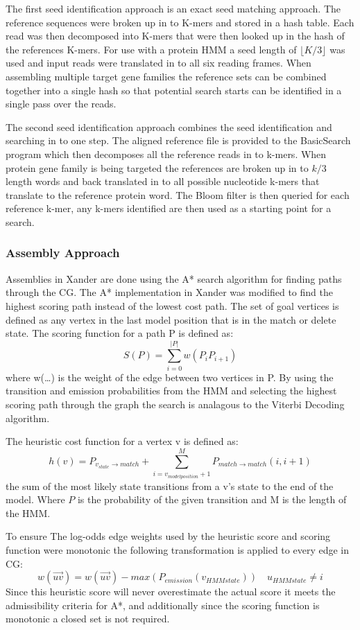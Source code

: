 \documentclass[10pt]{bmc_article}
\newenvironment{bmcformat}{\begin{raggedright}\baselineskip20pt\sloppy\setboolean{publ}{false}}{\end{raggedright}\baselineskip20pt\sloppy}
\begin{document}
\begin{bmcformat}
The first seed identification approach is an exact seed matching approach. The reference sequences were broken up in to K-mers and stored in a hash table. Each read was then decomposed into K-mers that were then looked up in the hash of the references K-mers.  For use with a protein HMM a seed length of $\lfloor K/3\rfloor$ was used and input reads were translated in to all six reading frames. When assembling multiple target gene families the reference sets can be combined together into a single hash so that potential search starts can be identified in a single pass over the reads.

The second seed identification approach combines the seed identification and searching in to one step.  The aligned reference file is provided to the BasicSearch program which then decomposes all the reference reads in to k-mers.  When protein gene family is being targeted the references are broken up in to $k/3$ length words and back translated in to all possible nucleotide k-mers that translate to the reference protein word.  The Bloom filter is then queried for each reference k-mer, any k-mers identified are then used as a starting point for a search.  

\subsubsection*{Assembly Approach}
Assemblies in Xander are done using the A* search algorithm\cite{hart_formal_1968} for finding paths through the CG.  The A* implementation in Xander was  modified to find the highest scoring path instead of the lowest cost path. The set of goal vertices is defined as any vertex in the last model position that is in the match or delete state.  The scoring function for a path P is defined as: 
\[S(P) = \sum_{i=0}^{|P|}w(P_iP_{i+1})\] 
where w(\ldots) is the weight of the edge between two vertices in P.  By using the transition and emission probabilities from the HMM and selecting the highest scoring path through the graph the search is analagous to the Viterbi Decoding\cite{viterbi_error_1967} algorithm.

The heuristic cost function for a vertex v is defined as:
\[h(v) = P_{v_{state}\rightarrow match} + \sum_{i=v_{model position} + 1}^{M}P_{match\rightarrow match}(i, i + 1)\]
the sum of the most likely state transitions from a v's state to the end of the model. Where $P$ is the probability of the given transition and M is the length of the HMM.

To ensure The log-odds edge weights used by the heuristic score and scoring function were monotonic the following transformation is applied to every edge in CG:
\[ w(\overrightarrow{uv}) = w(\overrightarrow{uv}) - max(P_{emission}(v_{HMM state})) \quad u_{HMM state} \ne i\]
Since this heuristic score will never overestimate the actual score it meets the admissibility criteria for A*, and additionally since the scoring function is monotonic a closed set is not required.


\end{bmcformat}
\end{document}
